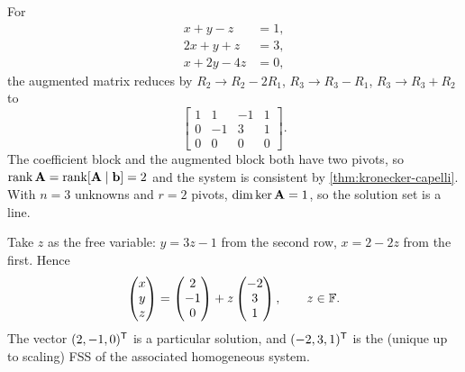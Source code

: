 \begin{example}
\label{ex:kc-general-solution}
For
\[
  \begin{aligned}
    x + y - z &= 1, \\
    2x + y + z &= 3, \\
    x + 2y - 4z &= 0,
  \end{aligned}
\]
the augmented matrix reduces by $R_2 \to R_2 - 2R_1$, $R_3 \to R_3 - R_1$,
$R_3 \to R_3 + R_2$ to
\[
  \left[\begin{array}{rrr|r}
    1 & 1 & -1 & 1 \\
    0 & -1 & 3 & 1 \\
    0 & 0 & 0 & 0
  \end{array}\right].
\]
The coefficient block and the augmented block both have two pivots, so
$\operatorname{rank} \mathbf{A} = \operatorname{rank} [\mathbf{A} \mid \mathbf{b}] = 2$ and the system is
consistent by \cref{thm:kronecker-capelli}. With $n = 3$ unknowns and
$r = 2$ pivots, $\dim \ker \mathbf{A} = 1$, so the solution set is a line.

Take $z$ as the free variable: $y = 3z - 1$ from the second row,
$x = 2 - 2z$ from the first. Hence
\[
  \begin{pmatrix} x \\ y \\ z \end{pmatrix}
  =
  \begin{pmatrix} 2 \\ -1 \\ 0 \end{pmatrix}
  + z \begin{pmatrix} -2 \\ 3 \\ 1 \end{pmatrix},
  \qquad z \in \mathbb{F}.
\]
The vector $(2, -1, 0)^{\mathsf{T}}$ is a particular solution, and
$(-2, 3, 1)^{\mathsf{T}}$ is the (unique up to scaling) FSS of the associated
homogeneous system.
\end{example}

